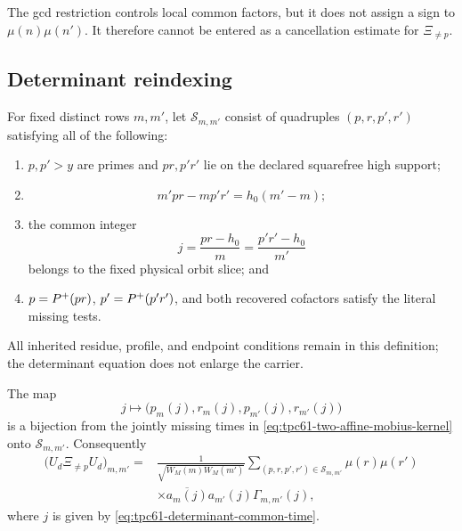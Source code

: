 The gcd restriction controls local common factors, but it does not assign a
sign to
\(\mu(n)\mu(n')\).  It therefore cannot be entered as a cancellation
estimate for \(\Xi_{\ne p}\).

\subsection{Determinant reindexing}

For fixed distinct rows \(m,m'\), let
\(\mathscr S_{m,m'}\) consist of quadruples
\((p,r,p',r')\) satisfying all of the following:
\begin{enumerate}[label=\textup{(\roman*)},leftmargin=3em]
 \item \(p,p'>y\) are primes and \(pr,p'r'\) lie on the declared
       squarefree high support;
 \item
       \begin{equation}
        m'pr-mp'r'=h_0(m'-m);
        \label{eq:tpc61-double-prime-determinant}
       \end{equation}
 \item the common integer
       \begin{equation}
        j=\frac{pr-h_0}{m}
         =\frac{p'r'-h_0}{m'}
        \label{eq:tpc61-determinant-common-time}
       \end{equation}
       belongs to the fixed physical orbit slice; and
 \item \(p=P^{+}(pr)\), \(p'=P^{+}(p'r')\), and both recovered
       cofactors satisfy the literal missing tests.
\end{enumerate}
All inherited residue, profile, and endpoint conditions remain in this
definition; the determinant equation does not enlarge the carrier.

\begin{proposition}
\label{prop:tpc61-determinant-parity-entry}
The map
\begin{equation}
 j\longmapsto
 \bigl(p_m(j),r_m(j),p_{m'}(j),r_{m'}(j)\bigr)
 \label{eq:tpc61-time-to-determinant-solution}
\end{equation}
is a bijection from the jointly missing times in
\eqref{eq:tpc61-two-affine-mobius-kernel} onto
\(\mathscr S_{m,m'}\).  Consequently
\begin{equation}
 \boxed{
 \begin{aligned}
 \bigl(U_d\Xi_{\ne p}U_d\bigr)_{m,m'}
 ={}&\frac{1}{\sqrt{W_M(m)W_M(m')}}
 \sum_{(p,r,p',r')\in\mathscr S_{m,m'}}
 \mu(r)\mu(r')\\
 &\times
 \overline{a_m(j)}a_{m'}(j)
 \Gamma_{m,m'}(j),
 \end{aligned}}
 \label{eq:tpc61-determinant-parity-kernel}
\end{equation}
where \(j\) is given by
\eqref{eq:tpc61-determinant-common-time}.
\end{proposition}

